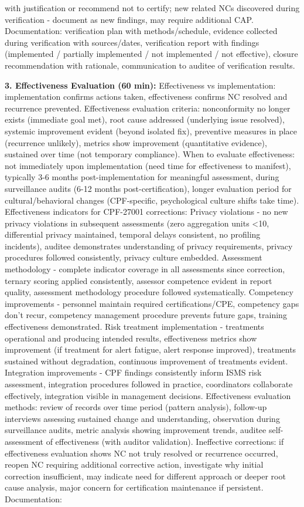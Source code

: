 \documentclass[11pt,a4paper]{article}
\begin{document}
with justification or recommend not to certify; new related NCs discovered during verification - document as new findings, may require additional CAP. Documentation: verification plan with methods/schedule, evidence collected during verification with sources/dates, verification report with findings (implemented / partially implemented / not implemented / not effective), closure recommendation with rationale, communication to auditee of verification results.

\textbf{3. Effectiveness Evaluation (60 min):} Effectiveness vs implementation: implementation confirms actions taken, effectiveness confirms NC resolved and recurrence prevented. Effectiveness evaluation criteria: nonconformity no longer exists (immediate goal met), root cause addressed (underlying issue resolved), systemic improvement evident (beyond isolated fix), preventive measures in place (recurrence unlikely), metrics show improvement (quantitative evidence), sustained over time (not temporary compliance). When to evaluate effectiveness: not immediately upon implementation (need time for effectiveness to manifest), typically 3-6 months post-implementation for meaningful assessment, during surveillance audits (6-12 months post-certification), longer evaluation period for cultural/behavioral changes (CPF-specific, psychological culture shifts take time). Effectiveness indicators for CPF-27001 corrections: Privacy violations - no new privacy violations in subsequent assessments (zero aggregation units <10, differential privacy maintained, temporal delays consistent, no profiling incidents), auditee demonstrates understanding of privacy requirements, privacy procedures followed consistently, privacy culture embedded. Assessment methodology - complete indicator coverage in all assessments since correction, ternary scoring applied consistently, assessor competence evident in report quality, assessment methodology procedure followed systematically. Competency improvements - personnel maintain required certifications/CPE, competency gaps don't recur, competency management procedure prevents future gaps, training effectiveness demonstrated. Risk treatment implementation - treatments operational and producing intended results, effectiveness metrics show improvement (if treatment for alert fatigue, alert response improved), treatments sustained without degradation, continuous improvement of treatments evident. Integration improvements - CPF findings consistently inform ISMS risk assessment, integration procedures followed in practice, coordinators collaborate effectively, integration visible in management decisions. Effectiveness evaluation methods: review of records over time period (pattern analysis), follow-up interviews assessing sustained change and understanding, observation during surveillance audits, metric analysis showing improvement trends, auditee self-assessment of effectiveness (with auditor validation). Ineffective corrections: if effectiveness evaluation shows NC not truly resolved or recurrence occurred, reopen NC requiring additional corrective action, investigate why initial correction insufficient, may indicate need for different approach or deeper root cause analysis, major concern for certification maintenance if persistent. Documentation: 
\end{document}
